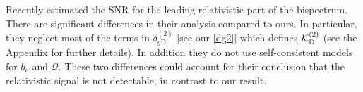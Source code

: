 Recently \cite{Jeong:2019igb} estimated the  SNR for the leading relativistic part of the bispectrum.  There are significant differences in their analysis compared to ours. In particular, they neglect most of the terms in $\delta_{g \mathrm{D}}^{(2)}$ [see our \eqref{dg2}] which defines ${\cal K}^{(2)}_{\mathrm{D}}$ (see the Appendix for further details). {In addition they do not use self-consistent models for $b_{e}$ and $\mathcal{Q}$. These two differences could account for their conclusion that the relativistic signal is not detectable, in contrast to our result.} 

%
%
